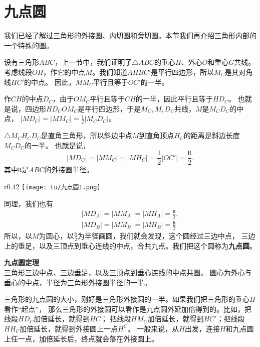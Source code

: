 \documentclass[12pt,UTF8]{ctexbook}
\begin{document}
\section{九点圆}

我们已经了解过三角形的外接圆、内切圆和旁切圆。本节我们再介绍三角形内部的一个特殊的圆。

设有三角形$ABC$，上一节中，我们证明了$\triangle ABC$的垂心$H$、外心$O$和重心$G$共线。
考虑线段$OH$，作它的中点$M$。我们知道$AHBC'$是平行四边形，所以$M_C$是其对角线$HC'$的中点。
因此，$MM_C$平行且等于$OC'$的一半。

作$CH$的中点$D_C$，由于$OM_C$平行且等于$CH$的一半，因此平行且等于$HD_C$。
也就是说，四边形$HD_COM_C$是平行四边形，于是$M_C, M, D_C$共线，$M$是$M_CD_C$的中点，
$|MD_C| = |MM_C| = \frac12 |M_CD_C|$。

$\triangle M_CH_CD_C$是直角三角形，所以斜边中点$M$到直角顶点$H_C$的距离是斜边长度$M_CD_C$的一半。
也就是说，
$$ |MD_C| = |MM_C| = |MH_C| = \frac12 |OC'| = \frac{\mathtt{R}}{2}.$$
其中$\mathtt{R}$是$ABC$的外接圆半径。

\begin{wrapfigure}[7]{r}{0.42\textwidth} %
    \vspace{-20pt}
    \flushright
    \texttt{[image: tu/九点圆1.png]}
\end{wrapfigure}

同理，我们也有
\begin{align*}
    |MD_A| = |MM_A| = |MH_A| = \frac{\mathtt{R}}{2},  \\
    |MD_B| = |MM_B| = |MH_B| = \frac{\mathtt{R}}{2}  
\end{align*} 
所以，以$M$为圆心，以$\frac{\mathtt{R}}{2}$为半径画圆，我们就会发现，这个圆经过三边中点，
三边上的垂足，以及三顶点到垂心连线的中点，合共九点。我们把这个圆称为\textbf{九点圆}。

\begin{tm}{\textbf{九点圆定理}}\label{tm:1-3-10}
    \mbox{} \\
    三角形三边中点、三边垂足，以及三顶点到垂心连线的中点共圆。
    圆心为外心与垂心的中点，半径为三角形外接圆半径的一半。
\end{tm}
三角形的九点圆的大小，刚好是三角形外接圆的一半。如果我们把三角形的垂心$H$看作“起点”，
那么三角形的外接圆可以看作是九点圆外延加倍得到的。比如，把线段$HD_C$加倍延长，就得到$HC$；
把线段$HM_C$加倍延长，就得到$HC'$；把线段$HH_C$加倍延长，就得到外接圆上一点$H^C$。
一般来说，从$H$出发，连接$H$和九点圆上任一点，加倍延长后，终点就会落在外接圆上。
\end{document}
